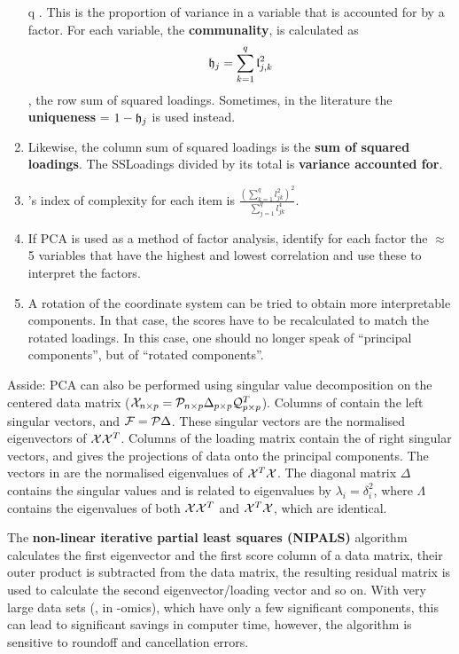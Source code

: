 \begin{refsection}
\begin{enumerate}
{{      q} \). This is the proportion of variance in a variable that is accounted for by a factor. For each variable, the \textbf{communality}, is calculated as \[\mathfrak{h}_j = \sum_{k=1}^{q}{\mathfrak{l}_{j,k}^2}\], the row sum of squared loadings. Sometimes, in the literature the \textbf{uniqueness}  = \( 1 - \mathfrak{h}_j \) is used instead.}
  \item{Likewise, the column sum of squared loadings is the \textbf{sum of squared loadings}. The SSLoadings divided by its total is \textbf{variance accounted for}. }
  \item{'s index of complexity \parencite{Hof-77} for each item is \(\frac{(\sum_{k=1}^{q}{l_{jk}^2})^2}{\sum_{j=1}^{q}{l_{j k}^4}} \). }
  \item{If \acs{PCA} is used as a method of factor analysis, identify for each factor the \(\approx \) \num{5} variables that have the highest and lowest correlation and use these to interpret the factors. }
  \item{A rotation of the coordinate system can be tried to obtain more interpretable components. In that case, the scores have to be recalculated to match the rotated loadings. In this case, one should no longer speak of ``principal components'', but of ``rotated components''.}
\end{enumerate}

Asside: \acs{PCA} can also be performed using singular value decomposition on the centered data matrix (\( \mathcal{X}_{n \times p} = \mathcal{P}_{n \times p} \Delta_{p \times p} \mathcal{Q}_{p \times p}^T \)). Columns of   contain the left singular vectors, and \(\mathcal{F} = \mathcal{P} \Delta \). These singular vectors are the normalised eigenvectors of \(\mathcal{X}\mathcal{X}^T \). Columns of the loading matrix  contain the of right singular vectors, and  gives the projections of data onto the principal components. The vectors in  are the normalised eigenvalues of \(\mathcal{X}^T \mathcal{X} \). The diagonal matrix \(\Delta \) contains the singular values and is related to eigenvalues by \(\lambda_i = \delta^2_i \), where \(\Lambda \) contains the eigenvalues of both \(\mathcal{X}\mathcal{X}^T \) and \(\mathcal{X}^T \mathcal{X} \), which are identical.

The \textbf{non-linear iterative partial least squares (NIPALS)} algorithm calculates the first eigenvector and the first score column of a data matrix, their outer product is subtracted from the data matrix, the resulting residual matrix is used to calculate the second eigenvector/loading vector and so on. With very large data sets (, in -omics), which have only a few significant components, this can lead to significant savings in computer time, however, the algorithm is sensitive to roundoff and cancellation errors.


\end{refsection}
